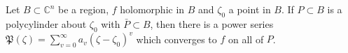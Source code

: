 Let $B \subset \mathbb{C}^n$ be a region, $f$ holomorphic in $B$ and $\zeta_0$ a point in $B$. If $P \subset B$ is a polycylinder about $\zeta_0$ with $\bar{P} \subset B$, then there is a power series $\mathfrak{P}(\zeta) = \sum_{v=0}^{\infty} a_v(\zeta - \zeta_0)^v$ which converges to $f$ on all of $P$.
